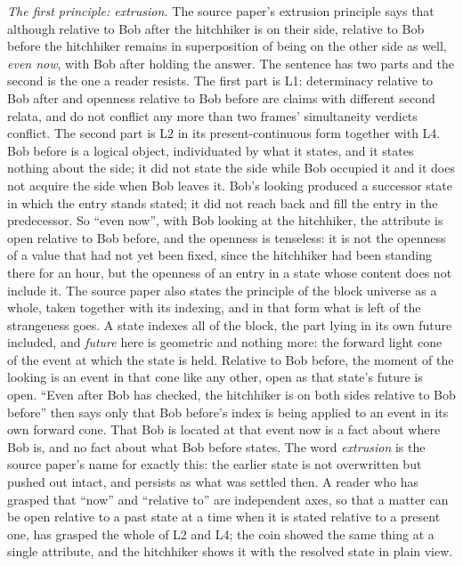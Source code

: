 \textit{The first principle: extrusion.} The source paper's extrusion principle says that although relative to Bob after the hitchhiker is on their side, relative to Bob before the hitchhiker remains in superposition of being on the other side as well, \emph{even now}, with Bob after holding the answer. The sentence has two parts and the second is the one a reader resists. The first part is L1: determinacy relative to Bob after and openness relative to Bob before are claims with different second relata, and do not conflict any more than two frames' simultaneity verdicts conflict. The second part is L2 in its present-continuous form together with L4. Bob before is a logical object, individuated by what it states, and it states nothing about the side; it did not state the side while Bob occupied it and it does not acquire the side when Bob leaves it. Bob's looking produced a successor state in which the entry stands stated; it did not reach back and fill the entry in the predecessor. So ``even now'', with Bob looking at the hitchhiker, the attribute is open relative to Bob before, and the openness is tenseless: it is not the openness of a value that had not yet been fixed, since the hitchhiker had been standing there for an hour, but the openness of an entry in a state whose content does not include it. The source paper also states the principle of the block universe as a whole, taken together with its indexing, and in that form what is left of the strangeness goes. A state indexes all of the block, the part lying in its own future included, and \emph{future} here is geometric and nothing more: the forward light cone of the event at which the state is held. Relative to Bob before, the moment of the looking is an event in that cone like any other, open as that state's future is open. ``Even after Bob has checked, the hitchhiker is on both sides relative to Bob before'' then says only that Bob before's index is being applied to an event in its own forward cone. That Bob is located at that event now is a fact about where Bob is, and no fact about what Bob before states. The word \emph{extrusion} is the source paper's name for exactly this: the earlier state is not overwritten but pushed out intact, and persists as what was settled then. A reader who has grasped that ``now'' and ``relative to'' are independent axes, so that a matter can be open relative to a past state at a time when it is stated relative to a present one, has grasped the whole of L2 and L4; the coin showed the same thing at a single attribute, and the hitchhiker shows it with the resolved state in plain view.


